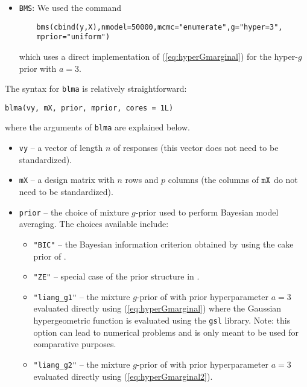 {\begin{itemize}
	\item {\tt BMS}: We used the command
	\begin{verbatim}
	bms(cbind(y,X),nmodel=50000,mcmc="enumerate",g="hyper=3",
	mprior="uniform")	
	\end{verbatim}
	
    \noindent which uses a direct implementation of (\ref{eq:hyperGmarginal})
    for the hyper-$g$ prior with $a=3$.
\end{itemize}

\noindent The syntax for {\tt blma} is relatively straightforward:

\begin{verbatim}
blma(vy, mX, prior, mprior, cores = 1L)
\end{verbatim}

\noindent where the arguments of {\tt blma}
are explained below.
\begin{itemize}
    \item {\tt vy} -- a vector of length $n$ of responses (this vector does not
        need to be standardized).
	
    \item {\tt mX} -- a design matrix with $n$ rows and $p$ columns (the
        columns of ${\tt mX}$ do not need to be standardized).
	
    \item {\tt prior} -- the choice of mixture $g$-prior used to perform
        Bayesian model averaging. The choices available include:
	\begin{itemize}
        \item {\tt "BIC"} -- the Bayesian information criterion obtained by
            using the cake prior of \cite{OrmerodEtal2017}. 
		
        \item {\tt "ZE"} -- special case of the prior structure in
            \cite{Maruyama2011}.
		
        \item {\tt "liang\_g1"} -- the mixture $g$-prior of \cite{Liang2008}
            with prior hyperparameter $a=3$ evaluated directly using
            (\ref{eq:hyperGmarginal}) where the Gaussian hypergeometric
            function is evaluated using the {\tt gsl} library. Note: this
            option can lead to numerical problems and is only meant to be used
            for comparative purposes.
		
        \item {\tt "liang\_g2"} -- the mixture $g$-prior of \cite{Liang2008}
            with prior hyperparameter $a=3$ evaluated directly using
            (\ref{eq:hyperGmarginal2}).
		

\end{itemize}
\end{itemize}}
